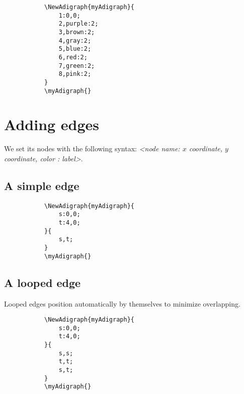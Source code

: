 \documentclass{report}
\begin{document}
\begin{figure}
	\begin{subfigure}{0.49\textwidth}
		\begin{verbatim}
\NewAdigraph{myAdigraph}{
	1:0,0;
	2,purple:2;
	3,brown:2;
	4,gray:2;
	5,blue:2;
	6,red:2;
	7,green:2;
	8,pink:2;
}
\myAdigraph{}
\end{verbatim}
	\end{subfigure}
	\begin{subfigure}{0.49\textwidth}
		\myAdigraph{}
	\end{subfigure}
\end{figure}


\section{Adding edges}
We set its nodes with the following syntax: \textit{<node name: \(x\) coordinate, \(y\) coordinate, color : label>}.

\subsection{A simple edge}
\begin{figure}
	\begin{subfigure}{0.49\textwidth}
		\begin{verbatim}
\NewAdigraph{myAdigraph}{
 	s:0,0;
 	t:4,0;
}{
	s,t;
}
\myAdigraph{}
\end{verbatim}
	\end{subfigure}
	\begin{subfigure}{0.49\textwidth}
		\myAdigraph{}
	\end{subfigure}
\end{figure}

\subsection{A looped edge}
Looped edges position automatically by themselves to minimize overlapping.
\begin{figure}
	\begin{subfigure}{0.49\textwidth}
		\begin{verbatim}
\NewAdigraph{myAdigraph}{
 	s:0,0;
 	t:4,0;
}{
	s,s;
	t,t;
	s,t;
}
\myAdigraph{}
\end{verbatim}
	\end{subfigure}
	\begin{subfigure}{0.49\textwidth}
		\myAdigraph{}
	\end{subfigure}
\end{figure}
\end{document}
